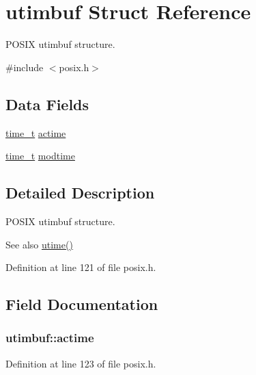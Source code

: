 \hypertarget{structutimbuf}{}\section{utimbuf Struct Reference}
\label{structutimbuf}


P\+O\+S\+IX utimbuf structure.  




{\ttfamily \#include $<$posix.\+h$>$}

\subsection*{Data Fields}
\begin{DoxyCompactItemize}
\item 
\hyperlink{time_8h_a3346b04b0420b32ccf6b706551b70762}{time\+\_\+t} \hyperlink{structutimbuf_aa39cf0bad7eff4df6239528506a557df}{actime}
\item 
\hyperlink{time_8h_a3346b04b0420b32ccf6b706551b70762}{time\+\_\+t} \hyperlink{structutimbuf_a7588ffe699a9eda52e94aa593bf7d6d8}{modtime}
\end{DoxyCompactItemize}


\subsection{Detailed Description}
P\+O\+S\+IX utimbuf structure. 

\begin{DoxySeeAlso}{See also}
\hyperlink{posix_8c_a732642e09075838bbbca28b3529f13db}{utime()} 
\end{DoxySeeAlso}


Definition at line 121 of file posix.\+h.



\subsection{Field Documentation}
\subsubsection[{\texorpdfstring{actime}{actime}}]{ utimbuf\+::actime}\hypertarget{structutimbuf_aa39cf0bad7eff4df6239528506a557df}{}\label{structutimbuf_aa39cf0bad7eff4df6239528506a557df}


Definition at line 123 of file posix.\+h.



